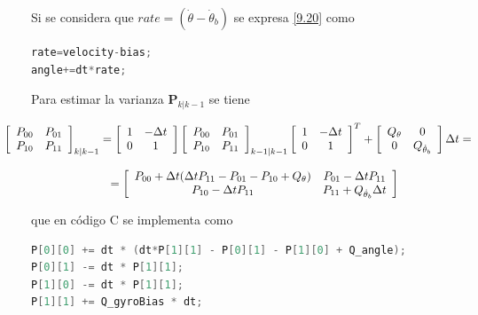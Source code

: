 \documentclass[twoside,11pt]{book}
\begin{document}
Si se considera que $rate=(\dot{\theta}-\dot{\theta}_{b})$ se expresa \ref{9.20} como 

\begin{lstlisting}[language=C]   
rate=velocity-bias;
angle+=dt*rate;
\end{lstlisting}

Para estimar la varianza $\mathbf{P}_{k|k-1}$ se tiene 

\begin{equation}
\begin{array}{c}

\hspace{-1cm} \left[ \begin{array}{cc}
P_{00} & P_{01} \\
P_{10} & P_{11} \\ \end{array} \right]_{k|k-1} = \left[ \begin{array}{cc}
1 & -\Delta t \\
0 & 1 \\ \end{array} \right] \left[ \begin{array}{cc}
P_{00} & P_{01} \\
P_{10} & P_{11} \\ \end{array} \right]_{k-1|k-1} \left[ \begin{array}{cc}
1 & -\Delta t \\
0 & 1 \\ \end{array} \right]^{T} + \left[ \begin{array}{cc}
Q_{\theta} & 0 \\
0 & Q_{\dot{\theta}_{b}} \\ \end{array} \right] \Delta t = \\
\\
= \left[ \begin{array}{cc}
P_{00} + \Delta t (\Delta t P_{11} - P_{01} - P_{10} + Q_{\theta}) & P_{01} - \Delta t P_{11} \\
P_{10} - \Delta t P_{11} & P_{11}+ Q_{\dot{\theta}_{b}}\Delta t \\ \end{array} \right]
\end{array}
\end{equation}

que en código C se implementa como

\begin{lstlisting}[language=C,firstnumber=3]
P[0][0] += dt * (dt*P[1][1] - P[0][1] - P[1][0] + Q_angle);
P[0][1] -= dt * P[1][1];
P[1][0] -= dt * P[1][1];
P[1][1] += Q_gyroBias * dt;
\end{lstlisting}
\end{document}
